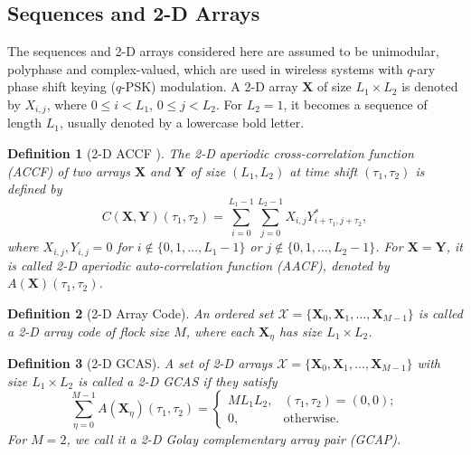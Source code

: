 \documentclass[pdflatex,sn-mathphys-num]{sn-jnl}%
\theoremstyle{thmstyleone}
\newtheorem{defn}{Definition}
\begin{document}
	\subsection{Sequences and 2-D Arrays}
	The sequences and 2-D arrays considered here are assumed to be unimodular, polyphase and complex-valued, which are used in wireless systems with $q$-ary phase shift keying ($q$-PSK) modulation. A 2-D array $\mathbf{X}$ of size $L_1 \times L_2$ is denoted by $X_{i,j}$, where $0 \leq i < L_1$, $0 \leq j < L_2$. For $L_2=1$, it becomes a sequence of length $L_1$, usually denoted by a lowercase bold letter.
	\begin{defn}[2-D ACCF ]
		The 2-D aperiodic cross-correlation function (ACCF) of two arrays $\mathbf{X}$ and $\mathbf{Y}$ of size $(L_1 , L_2)$ at time shift $(\tau_1, \tau_2)$ is defined by
		\begin{equation}
			C (\mathbf{X}, \mathbf{Y})(\tau_1, \tau_2)=
			\sum\limits_{i=0}^{L_1-1} \sum\limits_{j=0}^{L_2-1} X_{i,j} Y^*_{i+\tau_1, j+\tau_2},
		\end{equation}
		where $X_{i,j}, Y_{i,j} =0$ for $i \notin \{0,1,\dots, L_1-1\}$ or $j \notin \{0,1,\dots, L_2-1\}$.
		For $\mathbf{X} = \mathbf{Y}$, it is called 2-D aperiodic auto-correlation function (AACF), denoted by $A(\mathbf{X})(\tau_1, \tau_2)$.
	\end{defn}
	
	\begin{defn}[2-D Array Code]
		An ordered set $\mathcal{X}=\{\mathbf{X}_0, \mathbf{X}_1, \dots, \mathbf{X}_{M-1}\}$ is called a 2-D array code of flock size $M$, where each $\mathbf{X}_\eta$ has size $L_1 \times L_2$.
	\end{defn}
	
	\begin{defn}[2-D GCAS]
		A set of 2-D arrays $\mathcal{X}=\{\mathbf{X}_0, \mathbf{X}_1, \dots, \mathbf{X}_{M-1}\}$ with size $L_1 \times L_2$ is called a 2-D GCAS if they satisfy
		\begin{equation}
			\sum_{\eta=0}^{M-1} A (\mathbf{X}_\eta) (\tau_1, \tau_2)=
			\begin{cases}
				M L_1 L_2, &  (\tau_1, \tau_2)= (0,0);\\
				0, &  \text{otherwise}.
			\end{cases}
		\end{equation}
		For $M=2$, we call it a 2-D Golay complementary array pair (GCAP).
	\end{defn}
	
\end{document}
